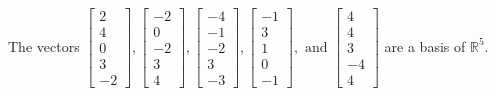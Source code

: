 \begin{exercise}
\begin{exerciseStatement}
  \end{exerciseStatement}
  \begin{exerciseAnswer}
   The vectors \(\left[\begin{array}{r}
2 \\
4 \\
0 \\
3 \\
-2
\end{array}\right] , \left[\begin{array}{r}
-2 \\
0 \\
-2 \\
3 \\
4
\end{array}\right] , \left[\begin{array}{r}
-4 \\
-1 \\
-2 \\
3 \\
-3
\end{array}\right] , \left[\begin{array}{r}
-1 \\
3 \\
1 \\
0 \\
-1
\end{array}\right] , \text{ and } \left[\begin{array}{r}
4 \\
4 \\
3 \\
-4 \\
4
\end{array}\right]\) 
  	 are  a basis of \(\mathbb{R}^5\).
  


  \end{exerciseAnswer}
\end{exercise}